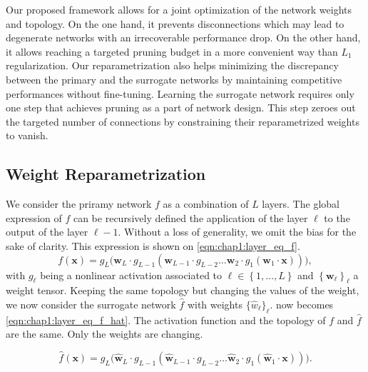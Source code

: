 Our proposed framework allows for a joint optimization of the network weights
and topology. On the one hand, it prevents disconnections which may lead to
degenerate networks with an irrecoverable performance drop. On the other hand,
it allows reaching a targeted pruning budget in a more convenient way than $L_1$
regularization. Our reparametrization also helps minimizing the discrepancy
between the primary and the surrogate networks by maintaining competitive
performances without fine-tuning. Learning the surrogate network requires only
one step that achieves pruning as a part of network design. This step zeroes out
the targeted number of connections by constraining their reparametrized weights
to vanish.

\subsection{Weight Reparametrization}
\label{sec:chap1:weight_reparam}

We consider the priramy network $f$ as a combination of $L$ layers. The global
expression of $f$ can be recursively defined the application of the layer $\ell$
to the output of the layer $\ell-1$. Without a loss of generality, we omit the
bias for the sake of clarity. This expression is shown on
\cref{eqn:chap1:layer_eq_f}.
\begin{equation}
\label{eqn:chap1:layer_eq_f}
f(\mathbf{x}) = g_L \big(\mathbf{w}_L \cdot g_{L-1}(\mathbf{w}_{L-1} \cdot g_{L-2} \dots
\mathbf{w}_2 \cdot g_1(\mathbf{w}_1 \cdot \mathbf{x}))\big),
\end{equation}
\noindent with $g_\ell$ being a nonlinear activation associated to $\ell \in
\left\{ 1,\dots, L \right\}$ and $\left\{ \mathbf{w}_\ell \right\}_\ell$ a
weight tensor. Keeping the same topology but changing the values of the weight,
we now consider the surrogate network $\hat{f}$ with weights
$\{\hat{w}_\ell\}_\ell$.  now becomes
\cref{eqn:chap1:layer_eq_f_hat}. The activation function and the topology of $f$
and $\hat{f}$ are the same. Only the weights are changing.

\begin{equation}
\label{eqn:chap1:layer_eq_f_hat}
\hat{f}(\mathbf{x}) = g_L \big(\mathbf{\hat w}_L \cdot g_{L-1}(\mathbf{\hat w}_{L-1} \cdot g_{L-2}
\dots\mathbf{\hat w}_2 \cdot g_1(\mathbf{\hat w}_1 \cdot \mathbf{x}))\big).
\end{equation}

